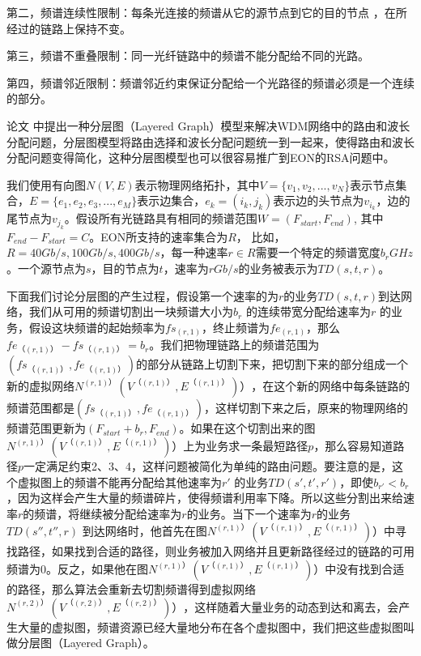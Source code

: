 第二，频谱连续性限制：每条光连接的频谱从它的源节点到它的目的节点 ，在所经过的链路上保持不变。

第三，频谱不重叠限制：同一光纤链路中的频谱不能分配给不同的光路。

第四，频谱邻近限制：频谱邻近约束保证分配给一个光路径的频谱必须是一个连续的部分。

论文 中提出一种分层图（Layered Graph）模型来解决WDM网络中的路由和波长分配问题，分层图模型将路由选择和波长分配问题统一到一起来，使得路由和波长分配问题变得简化，这种分层图模型也可以很容易推广到EON的RSA问题中。

我们使用有向图$N(V,E)$表示物理网络拓扑，其中$V=\{v_1,v_2,...,v_N\}$表示节点集合，$E=\{e_1,e_2,e_3,...,e_M\}$表示边集合，$e_k=(i_k,j_k)$表示边的头节点为$v_{i_k}$，边的尾节点为$v_{j_k}$。假设所有光链路具有相同的频谱范围$W=(F_{start},F_{end})$, 其中$F_{end}-F_{start}=C$。EON所支持的速率集合为$R$， 比如，$R={40Gb/s,100Gb/s,400Gb/s}$，每一种速率$r\in R$需要一个特定的频谱宽度$b_r GHz$。一个源节点为$s$，目的节点为$t$，速率为$r Gb/s$的业务被表示为$TD(s,t,r)$。

下面我们讨论分层图的产生过程，假设第一个速率的为$r$的业务$TD(s,t,r)$到达网络，我们从可用的频谱切割出一块频谱大小为$b_r$ 的连续带宽分配给速率为$r$ 的业务，假设这块频谱的起始频率为$fs_{( r,1 )}$，终止频谱为$fe_{( r,1 )}$，那么$fe_{（ (r,1) ）}-fs_{（ (r,1) ）}=b_r$。我们把物理链路上的频谱范围为$( fs_{（ (r,1) ）},fe_{（ (r,1) ）} )$的部分从链路上切割下来，把切割下来的部分组成一个新的虚拟网络$N^{( r,1) ）} ( V^{（ (r,1) ）},E^{（ (r,1) ）}) ）$，在这个新的网络中每条链路的频谱范围都是$(fs_{（ (r,1) ）},fe_{（ (r,1) ）})$，这样切割下来之后，原来的物理网络的频谱范围更新为$( F_{start}+b_r,F_{end} )$。如果在这个切割出来的图$N^{( r,1) ）} ( V^{（ (r,1) ）},E^{（ (r,1) ）}) ）$上为业务求一条最短路径$p$，那么容易知道路径$p$一定满足约束2、3、4，这样问题被简化为单纯的路由问题。要注意的是，这个虚拟图上的频谱不能再分配给其他速率为$r'$ 的业务$TD(s',t',r')$，即使$b_{r'}<b_r$，因为这样会产生大量的频谱碎片，使得频谱利用率下降。所以这些分割出来给速率$r$的频谱，将继续被分配给速率为$r$的业务。当下一个速率为$r$的业务$TD (s'',t'',r)$ 到达网络时，他首先在图$N^{( r,1) ）} ( V^{（ (r,1) ）},E^{（ (r,1) ）}) ）$中寻找路径，如果找到合适的路径，则业务被加入网络并且更新路径经过的链路的可用频谱为0。反之，如果他在图$N^{( r,1) ）} ( V^{（ (r,1) ）},E^{（ (r,1) ）}) ）$中没有找到合适的路径，那么算法会重新去切割频谱得到虚拟网络$N^{( r,2) ）} ( V^{（ (r,2) ）},E^{（ (r,2) ）}) ）$，这样随着大量业务的动态到达和离去，会产生大量的虚拟图，频谱资源已经大量地分布在各个虚拟图中，我们把这些虚拟图叫做分层图（Layered Graph）。


